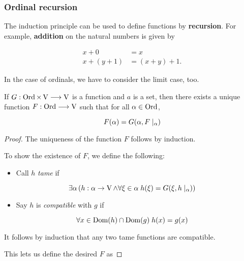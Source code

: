\subsubsection{Ordinal recursion}

The induction principle can be used to define functions by \textbf{recursion}. For example, \textbf{addition} on the natural numbers is given by

\begin{align*}
    x+0 \quad & =  x\\
    x+ (y+1) & =  (x + y)+1. 
\end{align*}

In the case of ordinals, we have to consider the limit case, too.

\begin{theorem}\label{thm-ordinal-recursion}If $G :\operatorname{Ord} \times \operatorname{V} \longrightarrow  \operatorname{V}$ is a function and $a$ is a set, then there exists a unique function $F: \operatorname{Ord} \longrightarrow \operatorname{V}$  such that for all $\alpha \in \operatorname{Ord}$,

\begin{equation}
F(\alpha) = G(\alpha, F\mid_{\alpha})
\end{equation}

\end{theorem}\begin{proof}The uniqueness of the function $F$ follows by induction.

To show the existence of $F$, we define the following:

\begin{itemize}
\item Call $h$ \textit{tame} if
\end{itemize}
\begin{equation*}
\exists \alpha \, (h: \alpha \to \operatorname{V}  \wedge \forall \xi \in \alpha \; h(\xi) = G(\xi, h \mid_{\alpha}))
\end{equation*}

\begin{itemize}
\item Say $h$ is \textit{compatible} with $g$ if
\end{itemize}
\begin{equation*}
\forall x \in \operatorname{Dom}(h) \cap \operatorname{Dom}(g) \; h(x) = g(x)
\end{equation*}

It follows by induction that any two tame functions are compatible.

This lets us define the desired $F$ as


\end{proof}
